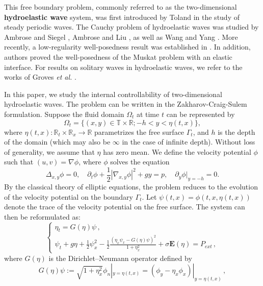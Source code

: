 \documentclass[12pt]{amsart}
\theoremstyle{remark}
\theoremstyle{definition}
\numberwithin{equation}{section}
\newcommand{\p}{\partial}
\newcommand{\R}{\mathbb{R}}
\newcommand{\f}{\frac}
\begin{document}
This free boundary problem, commonly referred to as the two-dimensional \textbf{hydroelastic wave} system, was first introduced by Toland \cite{MR2413099} in the study of steady periodic waves.
The Cauchy problem of hydroelastic waves was studied by Ambrose and Siegel \cite{MR3656704}, Ambrose and Liu \cite{MR3608168}, as well as Wang and Yang \cite{MR4104949,MR4846707}.
More recently, a low-regularity well-posedness result was established in \cite{WanY}. 
In addition, authors \cite{WanY26} proved the well-posedness of the Muskat problem with an elastic interface. For results on solitary waves in hydroelastic waves, we refer to the works of Groves \textit{et al.} \cite{MR4733013,MR3566507}.

In this paper, we study the internal controllability of two-dimensional hydroelastic waves.
The problem can be written in the Zakharov-Craig-Sulem formulation.
Suppose the fluid domain $\Omega_t$ at time $t$ can be represented by
\begin{equation*}
    \Omega_t = \{ (x,y) \in \mathbb{T}\times\R; -h< y<\eta(t,x) \},
\end{equation*}
where $\eta(t,x): \R_t \times \R_x \rightarrow \R$ parametrizes the free surface $\Gamma_t$, and $h$ is the depth of the domain (which may also be $\infty$ in the case of infinite depth).
Without loss of generality, we assume that $\eta$ has zero mean.
We define the velocity potential $\phi$ such that $(u,v) = \nabla \phi$, where $\phi$ solves the equation
\begin{equation*}
\Delta_{x,y}\phi = 0, \quad \p_t \phi + \f12 |\nabla_{x,y} \phi|^2 + gy = p, \quad \p_y \phi |_{y = -h} = 0.
\end{equation*}
By the classical theory of elliptic equations, the problem reduces to the evolution of the velocity potential on the boundary $\Gamma_t$. 
Let \( \psi(t, x) = \phi(t, x, \eta(t, x)) \) denote the trace of the velocity potential on the free surface. 
The system can then be reformulated as:
\begin{equation}\label{HydroWave}
\begin{cases}
 \eta_t = G(\eta)\psi\,, \\
\psi_t  + g\eta +\frac{1}{2} \psi_x^2- \f12\f{(\eta_x\psi_x-G(\eta)\psi)^2}{1+\eta^2_x} +\sigma \mathbf{E}(\eta) = P_{ext}\,,
\end{cases}
\end{equation}
where $G(\eta)$ is the Dirichlet–Neumann operator defined by
\begin{equation*}
 G(\eta)\psi := \sqrt{1+\eta_x^2}\phi_n |_{y=\eta(t,x)} = (\phi_y - \eta_x \phi_x)|_{y=\eta(t,x)}\,,   
\end{equation*}
\end{document}
